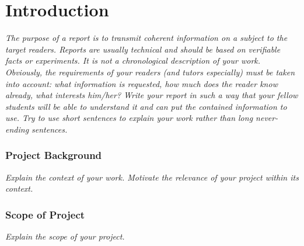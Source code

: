 \chapter{Introduction}
\label{ch:introduction}

\emph{The purpose of a report is to transmit coherent information on a subject to the target readers. Reports are usually technical and should be based on verifiable facts or experiments. It is not a chronological description of your work. Obviously, the requirements of your readers (and tutors especially) must be taken into account: what information is requested, how much does the reader know already, what interests him/her? Write your report in such a way that your fellow students will be able to understand it and can put the contained information to use. Try to use short sentences to explain your work rather than long never-ending sentences.}

\subsection{Project Background}
\emph{Explain the context of your work. Motivate the relevance of your project within its context.}

\subsection{Scope of Project}
\emph{Explain the scope of your project.}